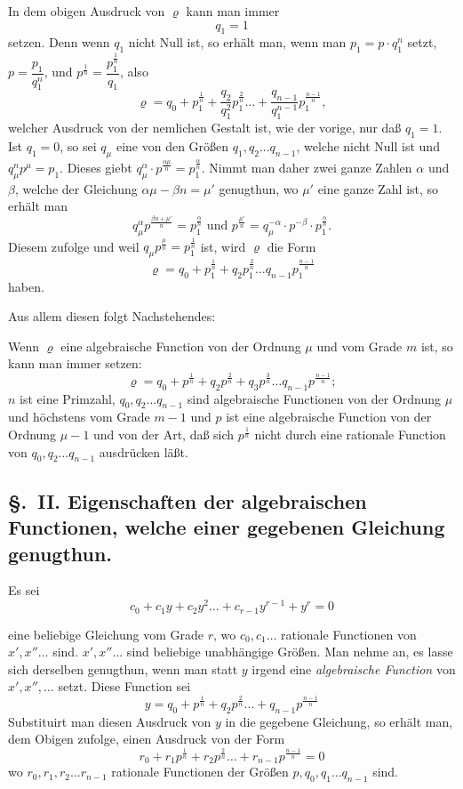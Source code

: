 \documentclass{article}
\begin{document}
In dem obigen Ausdruck von $\varrho$ kann man immer
\[ q_1 = 1 \]
setzen. Denn wenn $q_1$ nicht Null ist, so erhält man, wenn man $p_1 = p \cdot q_1^{n}$ setzt, $p = \dfrac{p_1}{q_1^{n}}$, und $p^{\frac{1}{n}} = \dfrac{p_1^{\frac{1}{n}}}{q_1}$, also
\[ \varrho = q_0 + p_1^{\frac{1}{n}} + \frac{q_2}{q_1^{2}} p_1^{\frac{2}{n}} \ldots + \frac{q_{n-1}}{q_1^{n-1}} p_1^{\frac{n-1}{n}}, \]
welcher Ausdruck von der nemlichen Gestalt ist, wie der vorige, nur daß $q_1 = 1$. Ist $q_1 = 0$, so sei $q_\mu$ eine von den Größen $q_1, q_2 \ldots q_{n-1}$, welche nicht Null ist und $q_\mu^{n} p^{\mu} = p_1$. Dieses giebt $q_\mu^{\alpha} \cdot p^{\frac{\alpha\mu}{n}} = p_1^{\frac{\alpha}{n}}$. Nimmt man daher zwei ganze Zahlen $\alpha$ und $\beta$, welche der Gleichung $\alpha\mu - \beta n = \mu'$ genugthun, wo $\mu'$ eine ganze Zahl ist, so erhält man
\[ q_\mu^{\alpha} p^{\frac{\beta n + \mu'}{n}} = p_1^{\frac{\alpha}{n}} \text{ und } p^{\frac{\mu'}{n}} = q_\mu^{-\alpha} \cdot p^{-\beta} \cdot p_1^{\frac{\alpha}{n}}. \]
Diesem zufolge und weil $q_\mu p^{\frac{\mu}{n}} = p_1^{\frac{1}{n}}$ ist, wird $\varrho$ die Form
\[ \varrho = q_0 + p_1^{\frac{1}{n}} + q_2 p_1^{\frac{2}{n}} \ldots q_{n-1} p_1^{\frac{n-1}{n}} \]
haben.

Aus allem diesen folgt Nachstehendes:

Wenn $\varrho$ eine algebraische Function von der Ordnung $\mu$ und vom Grade $m$ ist, so kann man immer setzen:
\[ \varrho = q_0 + p^{\frac{1}{n}} + q_2 p^{\frac{2}{n}} + q_3 p^{\frac{3}{n}} \ldots q_{n-1} p^{\frac{n-1}{n}}; \]
$n$ ist eine Primzahl, $q_0, q_2 \ldots q_{n-1}$ sind algebraische Functionen von der Ordnung $\mu$ und höchstens vom Grade $m - 1$ und $p$ ist eine algebraische Function von der Ordnung $\mu - 1$ und von der Art, daß sich $p^{\frac{1}{n}}$ nicht durch eine rationale Function von $q_0, q_2 \ldots q_{n-1}$ ausdrücken läßt.

\subsection*{§.~II. Eigenschaften der algebraischen Functionen, welche einer gegebenen Gleichung genugthun.}

Es sei
\[ c_0 + c_1 y + c_2 y^{2} \ldots + c_{r-1} y^{r-1} + y^{r} = 0 \tag{1} \]

eine beliebige Gleichung vom Grade $r$, wo $c_0, c_1 \ldots$ rationale Functionen von $x', x'' \ldots$ sind. $x', x'' \ldots$ sind beliebige unabhängige Größen. Man nehme an, es lasse sich derselben genugthun, wenn man statt $y$ irgend eine \emph{algebraische Function} von $x', x'', \ldots$ setzt. Diese Function sei
\[ y = q_0 + p^{\frac{1}{n}} + q_2 p^{\frac{2}{n}} \ldots + q_{n-1} p^{\frac{n-1}{n}} \tag{2} \]
Substituirt man diesen Ausdruck von $y$ in die gegebene Gleichung, so erhält man, dem Obigen zufolge, einen Ausdruck von der Form
\[ r_0 + r_1 p^{\frac{1}{n}} + r_2 p^{\frac{2}{n}} \ldots + r_{n-1} p^{\frac{n-1}{n}} = 0 \tag{3} \]
wo $r_0, r_1, r_2 \ldots r_{n-1}$ rationale Functionen der Größen $p, q_0, q_1 \ldots q_{n-1}$ sind.
\end{document}
